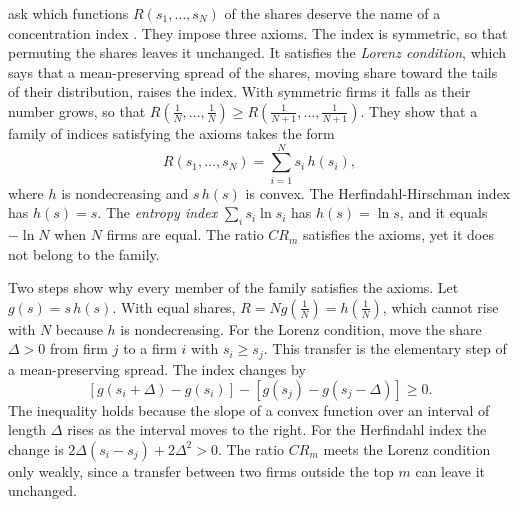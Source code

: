 \begin{remark}\label{rem:01-ej-axioms}
\citet{EncaouaJacquemin1980} ask which functions $R(s_1, \dots, s_N)$ of the shares deserve the name of a
concentration index \citep[Section~5.5]{Tirole1988}. They impose three axioms. The index is symmetric, so that
permuting the shares leaves it unchanged. It satisfies the \emph{Lorenz condition}, which says that a
mean-preserving spread of the shares, moving share toward the tails of their distribution, raises the index.
With symmetric firms it falls as their number grows, so that
$R\left(\frac{1}{N}, \dots, \frac{1}{N}\right) \ge R\left(\frac{1}{N+1}, \dots, \frac{1}{N+1}\right)$. They show
that a family of indices satisfying the axioms takes the form
\begin{equation}\label{eq:01-ej-family}
  R(s_1, \dots, s_N) = \sum_{i=1}^{N} s_i\, h(s_i) ,
\end{equation}
where $h$ is nondecreasing and $s\,h(s)$ is convex. The Herfindahl-Hirschman index has $h(s) = s$. The
\emph{entropy index} $\sum_i s_i \ln s_i$ has $h(s) = \ln s$, and it equals $-\ln N$ when $N$ firms are equal. The
ratio $\mathit{CR}_m$ satisfies the axioms, yet it does not belong to the family.

Two steps show why every member of the family satisfies the axioms. Let $g(s) = s\,h(s)$. With equal shares,
$R = N g\left(\frac{1}{N}\right) = h\left(\frac{1}{N}\right)$, which cannot rise with $N$ because $h$ is
nondecreasing. For the Lorenz condition, move the share $\Delta > 0$ from firm $j$ to a firm $i$ with
$s_i \ge s_j$. This transfer is the elementary step of a mean-preserving spread. The index changes by
\[
  \left[g(s_i + \Delta) - g(s_i)\right] - \left[g(s_j) - g(s_j - \Delta)\right] \ge 0 .
\]
The inequality holds because the slope of a convex function over an interval of length $\Delta$ rises as the
interval moves to the right. For the Herfindahl index the change is $2\Delta(s_i - s_j) + 2\Delta^2 > 0$. The
ratio $\mathit{CR}_m$ meets the Lorenz condition only weakly, since a transfer between two firms outside the top
$m$ can leave it unchanged.
\end{remark}

